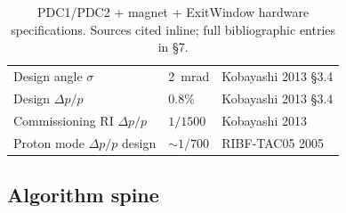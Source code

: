 \documentclass[a4paper, 11pt]{article}
\begin{document}
\begin{table}[H]
\begin{tabular}{p{5.0cm} p{5.0cm} p{4.6cm}}
    Design angle $\sigma$     & 2~mrad                               & Kobayashi 2013 §3.4 \\
    Design $\Delta p/p$       & 0.8\%                                & Kobayashi 2013 §3.4 \\
    Commissioning RI $\Delta p/p$ & $1/1500$                         & Kobayashi 2013 \\
    Proton mode $\Delta p/p$ design & $\sim 1/700$                   & RIBF-TAC05 2005 \\
    \bottomrule
  \end{tabular}
  \caption{PDC1/PDC2 + magnet + ExitWindow hardware specifications. Sources cited inline; full bibliographic entries in §7.}
  \label{tab:hardware-spec}
\end{table}

\subsection{Algorithm spine}
\end{document}
